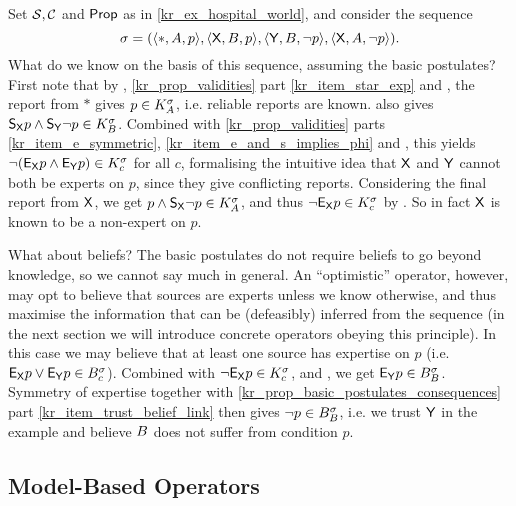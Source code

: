 \begin{example}
    \label{kr_ex_hospital_ex_formalised}
    Set $\mathcal{S}, \mathcal{C}$ and $\mathsf{Prop}$ as in \cref{kr_ex_hospital_world}, and consider
    the sequence
    \[
        \sigma
        = (
            \langle {\ast, A, p} \rangle,
            \langle {\mathsf{X}, B, p} \rangle,
            \langle {\mathsf{Y}, B, \neg p} \rangle,
            \langle {\mathsf{X}, A, \neg p} \rangle
        ).
    \]
    What do we know on the basis of this sequence, assuming the basic
    postulates? First note that by \soundness{}, \cref{kr_prop_validities}
    part \cref{kr_item_star_exp} and \closure{}, the report from $\ast$ gives $p
    \in K^\sigma_{A}$, i.e. reliable reports are known. \soundness{} also
    gives $\mathsf{S}_{\mathsf{X}}{p} \land \mathsf{S}_{\mathsf{Y}}{\neg p} \in K^\sigma_{B}$. Combined with
    \cref{kr_prop_validities} parts \cref{kr_item_e_symmetric},
    \cref{kr_item_e_and_s_implies_phi} and \closure{}, this yields
    $\neg(\mathsf{E}_{\mathsf{X}}{p} \land \mathsf{E}_{\mathsf{Y}}{p}) \in K^\sigma_c$ for all $c$, formalising the
    intuitive idea that $\mathsf{X}$ and $\mathsf{Y}$ cannot both be experts on $p$, since they
    give conflicting reports.
    Considering the final report from $\mathsf{X}$, we get $p \land \mathsf{S}_{\mathsf{X}}{\neg p} \in
    K^\sigma_{A}$, and thus $\neg \mathsf{E}_{\mathsf{X}}{p} \in K^\sigma_c$ by
    \closure{}. So in fact $\mathsf{X}$ is known to be a non-expert on $p$.

    What about beliefs? The basic postulates do not require beliefs to go
    beyond knowledge, so we cannot say much in general. An ``optimistic''
    operator, however, may opt to believe that sources are experts unless we
    know otherwise, and thus maximise the information that can be (defeasibly)
    inferred from the sequence (in the next section we will introduce
    concrete operators obeying this principle). In this case we may believe
    that at least one source has expertise on $p$ (i.e. $\mathsf{E}_{\mathsf{X}}{p} \lor \mathsf{E}_{\mathsf{Y}}{p} \in
    B^\sigma_c$).  Combined with $\neg \mathsf{E}_{\mathsf{X}}{p} \in K^\sigma_c$, \closure{} and
    \containment{}, we get $\mathsf{E}_{\mathsf{Y}}{p} \in B^\sigma_{B}$. Symmetry of expertise
    together with \cref{kr_prop_basic_postulates_consequences} part
    \cref{kr_item_trust_belief_link} then gives $\neg p \in
    B^\sigma_{B}$, i.e. we trust $\mathsf{Y}$ in the example and believe $B$
    does not suffer from condition $p$.

\end{example}

\subsection{Model-Based Operators}

